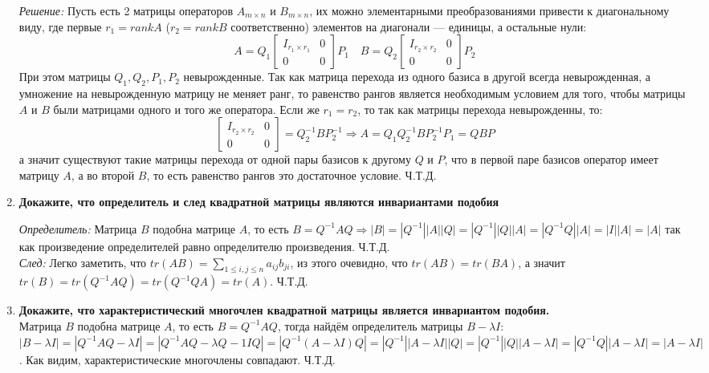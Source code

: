 \documentclass[12pt]{article} %
\begin{document}
\begin{enumerate}
    \textit{Решение:} Пусть есть 2 матрицы операторов $A_{m \times n}$ и $B_{m \times n}$, их можно элементарными преобразованиями привести к диагональному виду, где первые $r_1 = rankA$ ($r_2 = rankB$ соответственно) элементов на диагонали --- единицы, а остальные нули:
    \[
    A = Q_1
    \begin{bmatrix}
        I_{r_1 \times r_1} & 0 \\
        0 & 0
    \end{bmatrix}P_1
    \quad
    B = Q_2
    \begin{bmatrix}
        I_{r_2 \times r_2} & 0 \\
        0 & 0
    \end{bmatrix}P_2
    \]
    При этом матрицы $Q_1, Q_2, P_1, P_2$ невырожденные. Так как матрица перехода из одного базиса в другой всегда невырожденная, а умножение на невырожденную матрицу не меняет ранг, то равенство рангов является необходимым условием для того, чтобы матрицы $A$ и $B$ были матрицами одного и того же оператора. Если же $r_1 = r_2$, то так как матрицы перехода невырожденны, то:
    \[
    \begin{bmatrix}
        I_{r_2 \times r_2} & 0 \\
        0 & 0
    \end{bmatrix} = Q_2^{-1}BP_2^{-1} 
    \Rightarrow A = Q_1Q_2^{-1}BP_2^{-1}P_1 = QBP
    \]
    а значит существуют такие матрицы перехода от одной пары базисов к другому $Q$ и $P$, что в первой паре базисов оператор имеет матрицу $A$, а во второй $B$, то есть равенство рангов это достаточное условие. Ч.Т.Д.
    \item \textbf{Докажите, что определитель и след квадратной матрицы являются инвариантами подобия}

    \textit{Определитель:} Матрица $B$ подобна матрице $A$, то есть $B = Q^{-1}AQ \Rightarrow |B| = |Q^{-1}||A||Q| = |Q^{-1}||Q||A| = |Q^{-1}Q||A| = |I||A| = |A|$ так как произведение определителей равно определителю произведения. Ч.Т.Д.\\

    \textit{След:} Легко заметить, что $tr(AB) = \sum \limits_{1 \leqslant i, j \leqslant n} a_{ij}b_{ji}$, из этого очевидно, что $tr(AB) = tr(BA)$, а значит $tr(B) = tr(Q^{-1}AQ) = tr(Q^{-1}QA) = tr(A)$. Ч.Т.Д.
    
    \item \textbf{Докажите, что характеристический многочлен квадратной матрицы является инвариантом подобия.}\\
    Матрица $B$ подобна матрице $A$, то есть $B = Q^{-1}AQ$, тогда найдём определитель матрицы $B - \lambda I$: $|B - \lambda I| = |Q^{-1}AQ - \lambda I| = |Q^{-1}AQ - \lambda Q^{}-1IQ| = |Q^{-1}(A - \lambda I)Q| = |Q^{-1}||A - \lambda I||Q| = |Q^{-1}||Q||A - \lambda I| = |Q^{-1}Q||A - \lambda I| = |A - \lambda I|$. Как видим, характеристические многочлены совпадают. Ч.Т.Д.
    

\end{enumerate}
\end{document}
